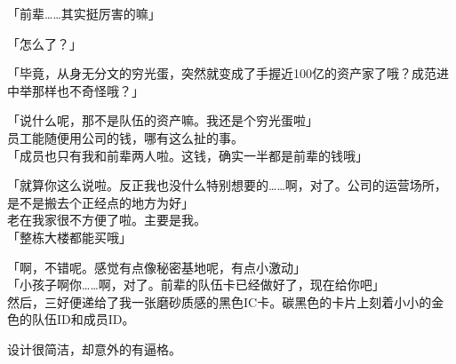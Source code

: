 「前辈……其实挺厉害的嘛」

「怎么了？」

「毕竟，从身无分文的穷光蛋，突然就变成了手握近100亿的资产家了哦？成范进中举那样也不奇怪哦？」

「说什么呢，那不是队伍的资产嘛。我还是个穷光蛋啦」\\

员工能随便用公司的钱，哪有这么扯的事。\\

「成员也只有我和前辈两人啦。这钱，确实一半都是前辈的钱哦」

「就算你这么说啦。反正我也没什么特别想要的……啊，对了。公司的运营场所，是不是搬去个正经点的地方为好」\\

老在我家很不方便了啦。主要是我。\\

「整栋大楼都能买哦」

「啊，不错呢。感觉有点像秘密基地呢，有点小激动」\\

「小孩子啊你……啊，对了。前辈的队伍卡已经做好了，现在给你吧」\\

然后，三好便递给了我一张磨砂质感的黑色IC卡。碳黑色的卡片上刻着小小的金色的队伍ID和成员ID。

设计很简洁，却意外的有逼格。\\

